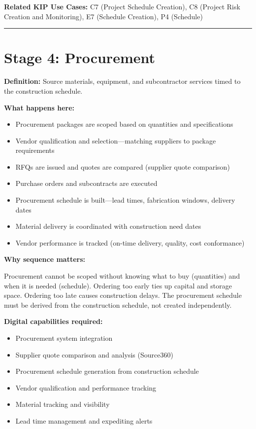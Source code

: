 \documentclass[11pt, letterpaper]{article}
\begin{document}
\textbf{Related KIP Use Cases:} C7 (Project Schedule Creation), C8 (Project Risk Creation and Monitoring), E7 (Schedule Creation), P4 (Schedule)

\vspace{1em}

\hrule

\vspace{1em}

\section*{Stage 4: Procurement}

\textbf{Definition:} Source materials, equipment, and subcontractor services timed to the construction schedule.

\textbf{What happens here:}
\begin{itemize}
    \item Procurement packages are scoped based on quantities and specifications
    \item Vendor qualification and selection---matching suppliers to package requirements
    \item RFQs are issued and quotes are compared (supplier quote comparison)
    \item Purchase orders and subcontracts are executed
    \item Procurement schedule is built---lead times, fabrication windows, delivery dates
    \item Material delivery is coordinated with construction need dates
    \item Vendor performance is tracked (on-time delivery, quality, cost conformance)
\end{itemize}

\textbf{Why sequence matters:}

Procurement cannot be scoped without knowing what to buy (quantities) and when it is needed (schedule). Ordering too early ties up capital and storage space. Ordering too late causes construction delays. The procurement schedule must be derived from the construction schedule, not created independently.

\textbf{Digital capabilities required:}
\begin{itemize}
    \item Procurement system integration
    \item Supplier quote comparison and analysis (Source360)
    \item Procurement schedule generation from construction schedule
    \item Vendor qualification and performance tracking
    \item Material tracking and visibility
    \item Lead time management and expediting alerts
\end{itemize}
\end{document}
